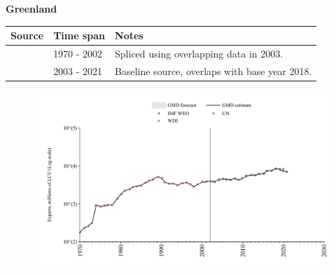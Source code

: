 \documentclass[12pt,a4paper,landscape]{article}
\begin{document}
\begin{adjustbox}{max totalsize={\paperwidth}{\paperheight},center}
\begin{minipage}[t][\textheight][t]{\textwidth}
\vspace*{0.5cm}
{}
\begin{center}
{\Large\bfseries Greenland}
\end{center}
\vspace{0.5cm}
\begin{table}[H]
\centering
\small
\begin{tabular}{|l|l|l|}
\hline
\textbf{Source} & \textbf{Time span} & \textbf{Notes} \\
\hline
\rowcolor{white}\cite{UN}& 1970 - 2002 &Spliced using overlapping data in 2003.\\
\rowcolor{lightgray}\cite{WDI}& 2003 - 2021 &Baseline source, overlaps with base year 2018.\\
\hline
\end{tabular}
\end{table}
\begin{figure}[H]
\centering
\includegraphics[width=\textwidth,height=0.6\textheight,keepaspectratio]{graphs/GRL_exports.pdf}
\end{figure}
\end{minipage}
\end{adjustbox}
\end{document}
